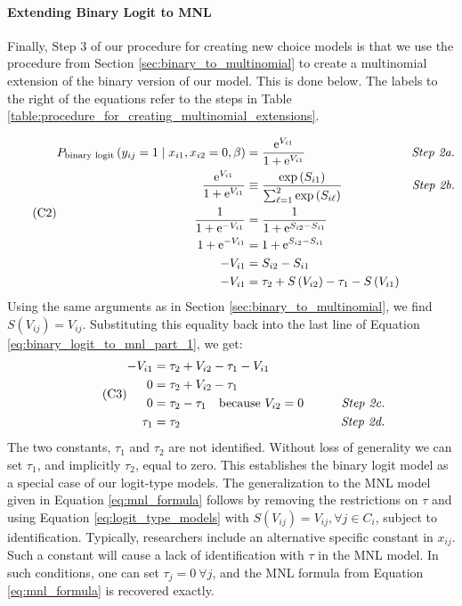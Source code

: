 \paragraph{Extending Binary Logit to MNL}
Finally, Step 3 of our procedure for creating new choice models is that we use the procedure from Section \ref{sec:binary_to_multinomial} to create a multinomial extension of the binary version of our model. This is done below. The labels to the right of the equations refer to the steps in Table \ref{table:procedure_for_creating_multinomial_extensions}.

\begin{equation}\tag{C2}
\label{eq:binary_logit_to_mnl_part_1}
\begin{aligned}
P_{\textrm{binary logit}}  \left( y_{ij} = 1 \mid x_{i1}, x_{i2} = 0, \beta \right) &= \dfrac{ \mathrm{e}^{V_{i1}} }{ 1 + \mathrm{e}^{V_{i1}} } \qquad &\textrm{\textit{Step 2a.}} \\ 
\dfrac{ \mathrm{e}^{V_{i1}} }{ 1 + \mathrm{e}^{V_{i1}} } &\equiv \frac{\exp \left( S_{i1} \right)}{\sum _{\ell = 1} ^2 \exp \left( S_{i \ell} \right)}  \qquad &\textrm{\textit{Step 2b.}}\\
\frac{1}{1 + \mathrm{e}^{- V_{i1}}} &= \frac{1}{1 + \mathrm{e}^{S_{i2} - S_{i1}}} \\
1 + \mathrm{e}^{- V_{i1}} &= 1 + \mathrm{e}^{S_{i2} - S_{i1}} \\
- V_{i1} &= S_{i2} - S_{i1} \\
- V_{i1} &= \tau_2 + S \left( V_{i2} \right) - \tau_1 - S \left( V_{i1} \right)
\end{aligned}
\end{equation}
Using the same arguments as in Section \ref{sec:binary_to_multinomial}, we find $S \left( V_{ij} \right) = V_{ij}$. Substituting this equality back into the last line of Equation \ref{eq:binary_logit_to_mnl_part_1}, we get:
\begin{equation}\tag{C3}
\begin{aligned}
- V_{i1} &= \tau_2 + V_{i2} - \tau_1 - V_{i1} \\
0 &= \tau_2 + V_{i2} - \tau_1 \\
0 &= \tau_2 - \tau_1 \quad \textrm{because $V_{i2} = 0$} \qquad &\textrm{\textit{Step 2c.}} \\
\tau_1 &= \tau_2 \qquad &\textrm{\textit{Step 2d.}}
\end{aligned}
\end{equation}
The two constants, $\tau_1$ and $\tau_2$ are not identified. Without loss of generality we can set $\tau_1$, and implicitly $\tau_2$, equal to zero. This establishes the binary logit model as a special case of our logit-type models. The generalization to the MNL model given in Equation \ref{eq:mnl_formula} follows by removing the restrictions on $\tau$ and using Equation \ref{eq:logit_type_models} with $S \left( V_{ij} \right) = V_{ij}, \forall j \in C_i$, subject to identification. Typically, researchers include an alternative specific constant in $x_{ij}$. Such a constant will cause a lack of identification with $\tau$ in the MNL model. In such conditions, one can set $\tau_j = 0 \  \forall j$, and the MNL formula from Equation \ref{eq:mnl_formula} is recovered exactly.

